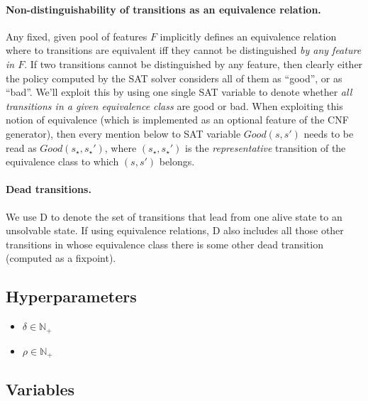 \documentclass[a4paper]{article}
\newcommand{\badtx}{\ensuremath{\mathrm{D}}}
\begin{document}
\paragraph{Non-distinguishability of transitions as an equivalence relation.}
Any fixed, given pool of features $F$ implicitly defines an equivalence relation where to transitions are
equivalent iff they cannot be distinguished \emph{by any feature in $F$}.
If two transitions cannot be distinguished by any feature, then clearly either the policy computed by the SAT solver
considers all of them as ``good'', or as ``bad''.
We'll exploit this by using one single SAT variable to denote whether \emph{all transitions in a given equivalence
class} are good or bad. When exploiting this notion of equivalence (which is implemented as an optional feature of
the CNF generator), then every mention below to SAT variable $Good(s, s')$ needs to be read as $Good(s_{\star}, s_{\star}')$,
where $(s_{\star}, s_{\star}')$ is the \emph{representative} transition of the equivalence class to which $(s, s')$ belongs.

\paragraph{Dead transitions.}
We use \badtx{} to denote the set of transitions that lead from one alive state to an unsolvable state.
If using equivalence relations, \badtx{} also includes all those other transitions in whose equivalence class
there is some other dead transition (computed as a fixpoint).


\newpage

\subsection{Hyperparameters}
\begin{itemize}
 \item $\delta \in \mathbb{N}_+$
 \item $\rho  \in \mathbb{N}_+$
\end{itemize}


\subsection{Variables}
\end{document}
